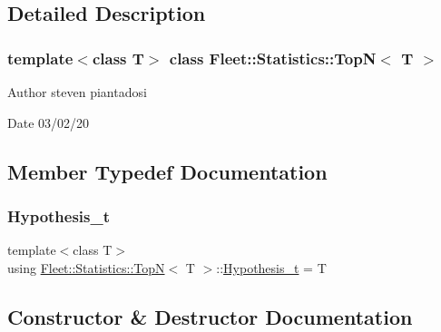 \subsection{Detailed Description}
\subsubsection*{template$<$class T$>$\newline
class Fleet\+::\+Statistics\+::\+Top\+N$<$ T $>$}

\begin{DoxyAuthor}{Author}
steven piantadosi 
\end{DoxyAuthor}
\begin{DoxyDate}{Date}
03/02/20 
\end{DoxyDate}


\subsection{Member Typedef Documentation}
\mbox{\label{class_fleet_1_1_statistics_1_1_top_n_af115f2778a79fca8e1f499d351af1b8b}} 
\subsubsection{\texorpdfstring{Hypothesis\+\_\+t}{Hypothesis\_t}}
{\footnotesize\ttfamily template$<$class T$>$ \\
using \hyperlink{class_fleet_1_1_statistics_1_1_top_n}{Fleet\+::\+Statistics\+::\+TopN}$<$ T $>$\+::\hyperlink{class_fleet_1_1_statistics_1_1_top_n_af115f2778a79fca8e1f499d351af1b8b}{Hypothesis\+\_\+t} =  T}



\subsection{Constructor \& Destructor Documentation}
\mbox{\label{class_fleet_1_1_statistics_1_1_top_n_afd0ca4daca84e66e91a4101cb009af44}} 
